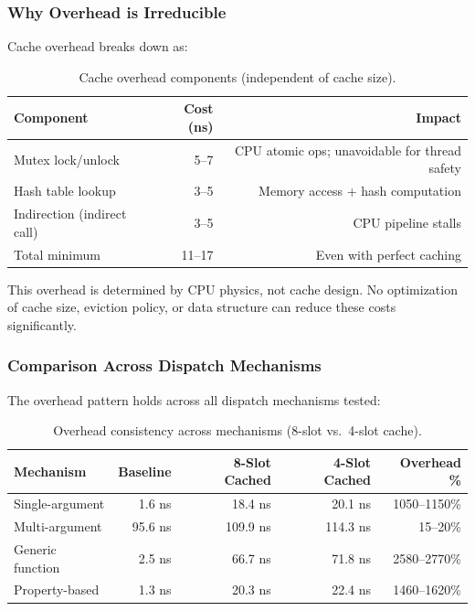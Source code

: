 \documentclass[sigplan,final]{acmart}
\begin{document}
\subsubsection{Why Overhead is Irreducible}

Cache overhead breaks down as:

\begin{table}[h]
\centering
\caption{Cache overhead components (independent of cache size).}
\label{tab:overhead-breakdown}
\begin{tabular}{@{}lrr@{}}
\toprule
\textbf{Component} & \textbf{Cost (ns)} & \textbf{Impact} \\
\midrule
Mutex lock/unlock & 5--7 & CPU atomic ops; unavoidable for thread safety \\
Hash table lookup & 3--5 & Memory access + hash computation \\
Indirection (indirect call) & 3--5 & CPU pipeline stalls \\
\midrule
Total minimum & 11--17 & Even with perfect caching \\
\bottomrule
\end{tabular}
\end{table}

This overhead is determined by CPU physics, not cache design. No optimization of cache size,
eviction policy, or data structure can reduce these costs significantly.

\subsubsection{Comparison Across Dispatch Mechanisms}

The overhead pattern holds across all dispatch mechanisms tested:

\begin{table}[h]
\centering
\caption{Overhead consistency across mechanisms (8-slot vs.~4-slot cache).}
\label{tab:mech-overhead}
\begin{tabular}{@{}lrrrr@{}}
\toprule
\textbf{Mechanism} & \textbf{Baseline} & \textbf{8-Slot Cached} & \textbf{4-Slot Cached} & \textbf{Overhead \%} \\
\midrule
Single-argument & 1.6 ns & 18.4 ns & 20.1 ns & 1050--1150\% \\
Multi-argument & 95.6 ns & 109.9 ns & 114.3 ns & 15--20\% \\
Generic function & 2.5 ns & 66.7 ns & 71.8 ns & 2580--2770\% \\
Property-based & 1.3 ns & 20.3 ns & 22.4 ns & 1460--1620\% \\
\bottomrule
\end{tabular}
\end{table}
\end{document}
